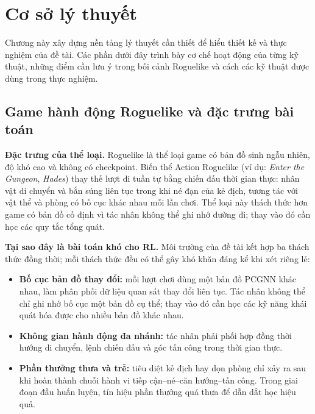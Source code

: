 \clearpage
{}

\setcounter{chapter}{0}
\chapter[{Cơ sở lý thuyết}]{Cơ sở lý thuyết}

Chương này xây dựng nền tảng lý thuyết cần thiết để hiểu thiết kế và thực nghiệm của đề tài. Các phần dưới đây trình bày cơ chế hoạt động của từng kỹ thuật, những điểm cần lưu ý trong bối cảnh Roguelike và cách các kỹ thuật được dùng trong thực nghiệm.

\section{Game hành động Roguelike và đặc trưng bài toán}

\textbf{Đặc trưng của thể loại.} Roguelike là thể loại game có bản đồ sinh ngẫu nhiên, độ khó cao và không có checkpoint. Biến thể Action Roguelike (ví dụ: \textit{Enter the Gungeon}, \textit{Hades}) thay thế lượt đi tuần tự bằng chiến đấu thời gian thực: nhân vật di chuyển và bắn súng liên tục trong khi né đạn của kẻ địch, tương tác với vật thể và phòng có bố cục khác nhau mỗi lần chơi. Thể loại này thách thức hơn game có bản đồ cố định vì tác nhân không thể ghi nhớ đường đi; thay vào đó cần học các quy tắc tổng quát.

\textbf{Tại sao đây là bài toán khó cho RL.} Môi trường của đề tài kết hợp ba thách thức đồng thời; mỗi thách thức đều có thể gây khó khăn đáng kể khi xét riêng lẻ:

\begin{itemize}
    \item \textbf{Bố cục bản đồ thay đổi:} mỗi lượt chơi dùng một bản đồ PCGNN khác nhau, làm phân phối dữ liệu quan sát thay đổi liên tục. Tác nhân không thể chỉ ghi nhớ bố cục một bản đồ cụ thể; thay vào đó cần học các kỹ năng khái quát hóa được cho nhiều bản đồ khác nhau.
    \item \textbf{Không gian hành động đa nhánh:} tác nhân phải phối hợp đồng thời hướng di chuyển, lệnh chiến đấu và góc tấn công trong thời gian thực.
    \item \textbf{Phần thưởng thưa và trễ:} tiêu diệt kẻ địch hay dọn phòng chỉ xảy ra sau khi hoàn thành chuỗi hành vi tiếp cận--né--căn hướng--tấn công. Trong giai đoạn đầu huấn luyện, tín hiệu phần thưởng quá thưa để dẫn dắt học hiệu quả.
\end{itemize}

